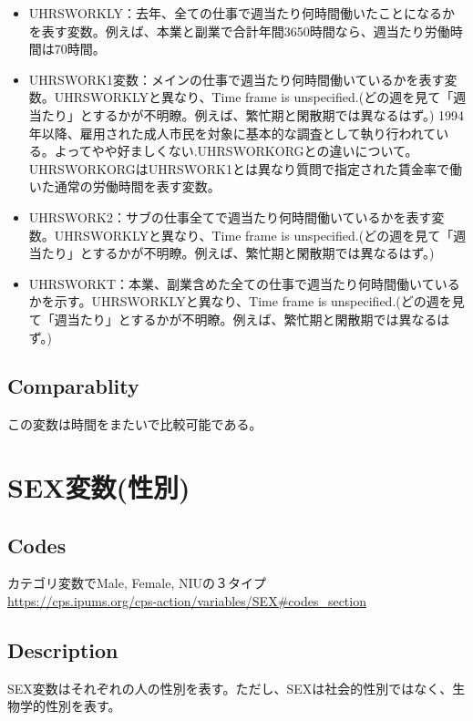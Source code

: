 \documentclass{jsarticle}
\begin{document}
\begin{itemize}
    \item UHRSWORKLY：去年、全ての仕事で週当たり何時間働いたことになるかを表す変数。例えば、本業と副業で合計年間3650時間なら、週当たり労働時間は70時間。
    
    \item UHRSWORK1変数：メインの仕事で週当たり何時間働いているかを表す変数。UHRSWORKLYと異なり、Time frame is unspecified.(どの週を見て「週当たり」とするかが不明瞭。例えば、繁忙期と閑散期では異なるはず。)  1994年以降、雇用された成人市民を対象に基本的な調査として執り行われている。よってやや好ましくない.UHRSWORKORGとの違いについて。UHRSWORKORGはUHRSWORK1とは異なり質問で指定された賃金率で働いた通常の労働時間を表す変数。
    
    \item UHRSWORK2：サブの仕事全てで週当たり何時間働いているかを表す変数。UHRSWORKLYと異なり、Time frame is unspecified.(どの週を見て「週当たり」とするかが不明瞭。例えば、繁忙期と閑散期では異なるはず。)  
    
    \item UHRSWORKT：本業、副業含めた全ての仕事で週当たり何時間働いているかを示す。UHRSWORKLYと異なり、Time frame is unspecified.(どの週を見て「週当たり」とするかが不明瞭。例えば、繁忙期と閑散期では異なるはず。)  


\end{itemize}

\subsection{Comparablity}

この変数は時間をまたいで比較可能である。

\section{SEX変数(性別)}

\subsection{Codes}
カテゴリ変数でMale, Female, NIUの３タイプ\\
  
\url{https://cps.ipums.org/cps-action/variables/SEX#codes_section}

\subsection{Description}
SEX変数はそれぞれの人の性別を表す。ただし、SEXは社会的性別ではなく、生物学的性別を表す。\\
  
\end{document}
